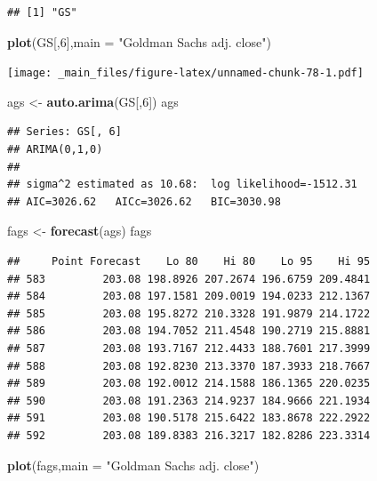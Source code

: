 \documentclass[]{book}
\newenvironment{Shaded}{\begin{snugshade}}{\end{snugshade}}
\newcommand{\DataTypeTok}[1]{\textcolor[rgb]{0.13,0.29,0.53}{#1}}
\newcommand{\DecValTok}[1]{\textcolor[rgb]{0.00,0.00,0.81}{#1}}
\newcommand{\KeywordTok}[1]{\textcolor[rgb]{0.13,0.29,0.53}{\textbf{#1}}}
\newcommand{\NormalTok}[1]{#1}
\newcommand{\StringTok}[1]{\textcolor[rgb]{0.31,0.60,0.02}{#1}}
\begin{document}
\begin{verbatim}
## [1] "GS"
\end{verbatim}

\begin{Shaded}
\begin{Highlighting}[]
\KeywordTok{plot}\NormalTok{(GS[,}\DecValTok{6}\NormalTok{],}\DataTypeTok{main =} \StringTok{"Goldman Sachs adj. close"}\NormalTok{)}
\end{Highlighting}
\end{Shaded}

\texttt{[image: \_main\_files/figure-latex/unnamed-chunk-78-1.pdf]}

\begin{Shaded}
\begin{Highlighting}[]
\NormalTok{ags <-}\StringTok{ }\KeywordTok{auto.arima}\NormalTok{(GS[,}\DecValTok{6}\NormalTok{])}
\NormalTok{ags}
\end{Highlighting}
\end{Shaded}

\begin{verbatim}
## Series: GS[, 6] 
## ARIMA(0,1,0) 
## 
## sigma^2 estimated as 10.68:  log likelihood=-1512.31
## AIC=3026.62   AICc=3026.62   BIC=3030.98
\end{verbatim}

\begin{Shaded}
\begin{Highlighting}[]
\NormalTok{fags <-}\StringTok{ }\KeywordTok{forecast}\NormalTok{(ags)}
\NormalTok{fags}
\end{Highlighting}
\end{Shaded}

\begin{verbatim}
##     Point Forecast    Lo 80    Hi 80    Lo 95    Hi 95
## 583         203.08 198.8926 207.2674 196.6759 209.4841
## 584         203.08 197.1581 209.0019 194.0233 212.1367
## 585         203.08 195.8272 210.3328 191.9879 214.1722
## 586         203.08 194.7052 211.4548 190.2719 215.8881
## 587         203.08 193.7167 212.4433 188.7601 217.3999
## 588         203.08 192.8230 213.3370 187.3933 218.7667
## 589         203.08 192.0012 214.1588 186.1365 220.0235
## 590         203.08 191.2363 214.9237 184.9666 221.1934
## 591         203.08 190.5178 215.6422 183.8678 222.2922
## 592         203.08 189.8383 216.3217 182.8286 223.3314
\end{verbatim}

\begin{Shaded}
\begin{Highlighting}[]
\KeywordTok{plot}\NormalTok{(fags,}\DataTypeTok{main =} \StringTok{"Goldman Sachs adj. close"}\NormalTok{)}
\end{Highlighting}
\end{Shaded}
\end{document}
